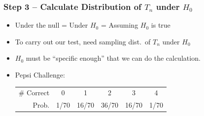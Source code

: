 \begin{frame}

  \frametitle{Step 3 -- Calculate Distribution of $T_n$ under $H_0$}

    \begin{itemize}
      \item \alert{Under the null = Under $H_0$ = Assuming $H_0$ is true}
      \item To carry out our test, need sampling dist.\ of $T_n$ under $H_0$ 
      \item $H_0$ must be ``specific enough'' that we can do the calculation. 
      \item Pepsi Challenge:
        \vspace{1em}
            \begin{center}
              \begin{tabular}{rccccc}
                \hline
                \# Correct & 0 & 1 & 2 & 3 & 4\\
                Prob.&1/70 & 16/70 & 36/70 & 16/70 &1/70\\
                \hline
              \end{tabular}
            \end{center}
    \end{itemize}
    
  
\end{frame}
